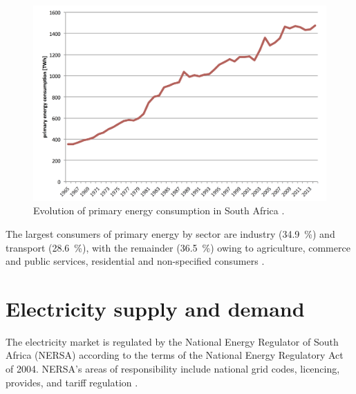 \begin{figure}[htbp]  
\centering
\includegraphics[width=1\linewidth]{FIG/PrimEnergyDevelopment}
\caption[Evolution of primary energy consumption in South Africa.]{Evolution of primary energy consumption in South Africa \cite{BP2015c}.}\label{PrimEnergyDevelopment}
\end{figure}
The largest consumers of primary energy by sector are industry (\SI{34.9}{\percent}) and transport (\SI{28.6}{\percent}), with the remainder (\SI{36.5}{\percent}) owing to agriculture, commerce and public services, residential and non-specified consumers \cite{DepartmentofEnergy2012}.

\pagebreak
\section{Electricity supply and demand}
The electricity market is regulated by the National Energy Regulator of South Africa (NERSA) according to the terms of the National Energy Regulatory Act of 2004. NERSA's areas of responsibility include national grid codes, licencing, provides, and tariff regulation \cite{Eskom2015a}.


